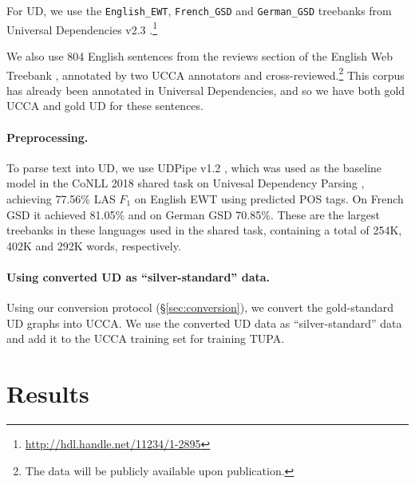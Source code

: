 \documentclass[11pt,a4paper]{article}
\begin{document}
For UD, we use the \verb|English_EWT|, \verb|French_GSD| and \verb|German_GSD|
treebanks from Universal Dependencies v2.3
\cite{11234/1-2895}.\footnote{\url{http://hdl.handle.net/11234/1-2895}}

We also use 804 English sentences from the reviews section of the English Web Treebank
\cite[EWT; ][]{bies2012english},
annotated by two UCCA annotators and
cross-reviewed.\footnote{The data will be publicly
available upon publication.}
This corpus has already been annotated in Universal Dependencies,
and so we have both gold UCCA and gold UD for these sentences.

\paragraph{Preprocessing.}

To parse text into UD, we use UDPipe v1.2 \cite{udpipe,udpipe:2017},
which was used as the baseline model in the CoNLL 2018 shared task on
Univesal Dependency Parsing \cite{zeman-EtAl:2018:K18-2},
achieving 77.56\% LAS $F_1$ on English EWT using predicted POS tags.
On French GSD it achieved 81.05\% and on German GSD 70.85\%.
These are the largest treebanks in these languages
used in the shared task, containing a total of 254K, 402K and 292K
words, respectively.

\paragraph{Using converted UD as ``silver-standard'' data.}

Using our conversion protocol (\S\ref{sec:conversion}),
we convert the gold-standard UD graphs into UCCA.
We use the converted UD data as ``silver-standard'' data \cite{W17-7306,N18-1104}
and add it to the UCCA training set for training TUPA.

\section{Results}\label{sec:results}
\end{document}
